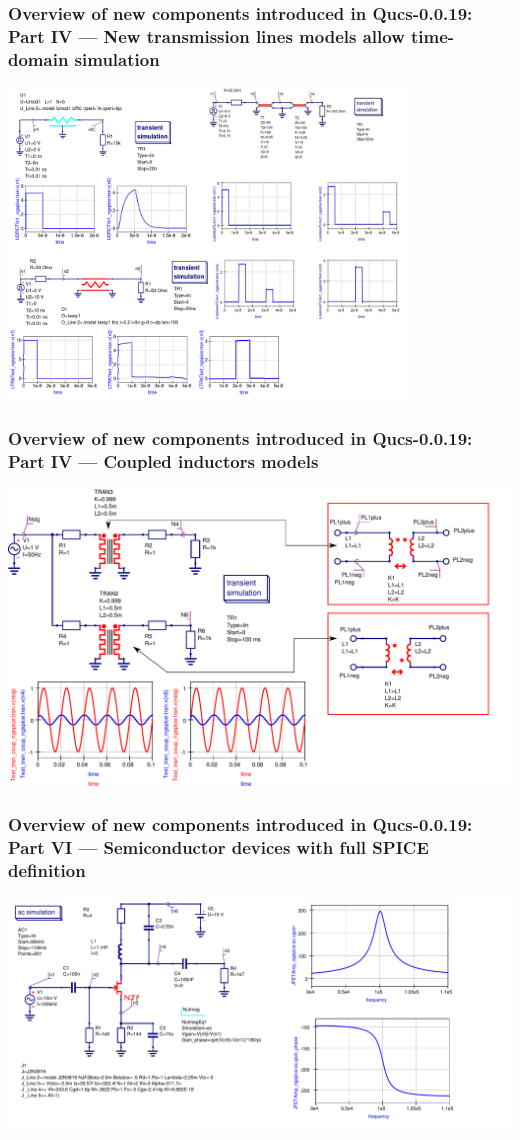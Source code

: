 \documentclass[9pt]{beamer}
\begin{document}
\begin{frame}
  \frametitle{Overview of new components introduced in Qucs-0.0.19: \\ Part IV 
--- New transmission lines models allow time-domain simulation}
  \centering
  \includegraphics[width=0.8\textwidth]{img/tline.png}
\end{frame}

\begin{frame}
 \frametitle{Overview of new components introduced in Qucs-0.0.19: \\ Part IV 
--- Coupled inductors models}
 \includegraphics[width=\textwidth]{img/transf_test.pdf}
\end{frame}


\begin{frame}
  \frametitle{Overview of new components introduced in Qucs-0.0.19: \\ Part VI 
--- Semiconductor devices with full SPICE definition}
\includegraphics[width=1.2\textwidth]{img/njfet.pdf}
\end{frame}
\end{document}
